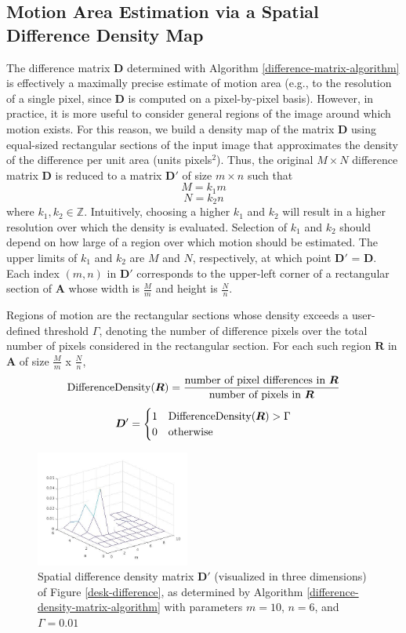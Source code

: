 \documentclass[journal]{IEEEtran}
\begin{document}
\subsection{Motion Area Estimation via a Spatial Difference Density Map}
The difference matrix $\boldsymbol{D}$ determined with Algorithm \ref{difference-matrix-algorithm} is effectively a maximally precise estimate of motion area (e.g., to the resolution of a single pixel, since $\boldsymbol{D}$ is computed on a pixel-by-pixel basis). However, in practice, it is more useful to consider general regions of the image around which motion exists. For this reason, we build a density map of the matrix $\boldsymbol{D}$ using equal-sized rectangular sections of the input image that approximates the density of the difference per unit area (units pixels$^2$). Thus, the original $M \times N$ difference matrix $\boldsymbol{D}$ is reduced to a matrix $\boldsymbol{D}'$ of size $m \times n$ such that
$$M = k_1 m$$
$$N = k_2 n$$
where $k_1, k_2 \in \mathbb{Z}$. Intuitively, choosing a higher $k_1$ and $k_2$ will result in a higher resolution over which the density is evaluated. Selection of $k_1$ and $k_2$ should depend on how large of a region over which motion should be estimated. The upper limits of $k_1$ and $k_2$ are $M$ and $N$, respectively, at which point $\boldsymbol{D}'$ = $\boldsymbol{D}$. Each index $(m, n)$ in $\boldsymbol{D}'$ corresponds to the upper-left corner of a rectangular section of $\boldsymbol{A}$ whose width is $\frac{M}{m}$ and height is $\frac{N}{n}$.
\par Regions of motion are the rectangular sections whose density exceeds a user-defined threshold $\Gamma$, denoting the number of difference pixels over the total number of pixels considered in the rectangular section. For each such region $\boldsymbol{R}$ in $\boldsymbol{A}$ of size $\frac{M}{m}$ x $\frac{N}{n}$,
$$\textnormal{DifferenceDensity}(\boldsymbol{R}) = \frac{\textnormal{number of pixel differences in } \boldsymbol{R}}{\textnormal{number of pixels in } \boldsymbol{R}}$$
\[
\boldsymbol{D}' =
\begin{cases}
1 & \textnormal{DifferenceDensity}(\boldsymbol{R}) > \Gamma\\
0 & \textnormal{otherwise}
\end{cases}
\]
\begin{figure}[]
	\centering
	\includegraphics[width=0.45\textwidth]{desk_difference_density.jpg}
	\caption{Spatial difference density matrix $\boldsymbol{D}'$ (visualized in three dimensions) of Figure \ref{desk-difference}, as determined by Algorithm \ref{difference-density-matrix-algorithm} with parameters $m = 10$, $n = 6$, and $\Gamma = 0.01$}
    \label{desk-difference-density}
\end{figure}
\end{document}
